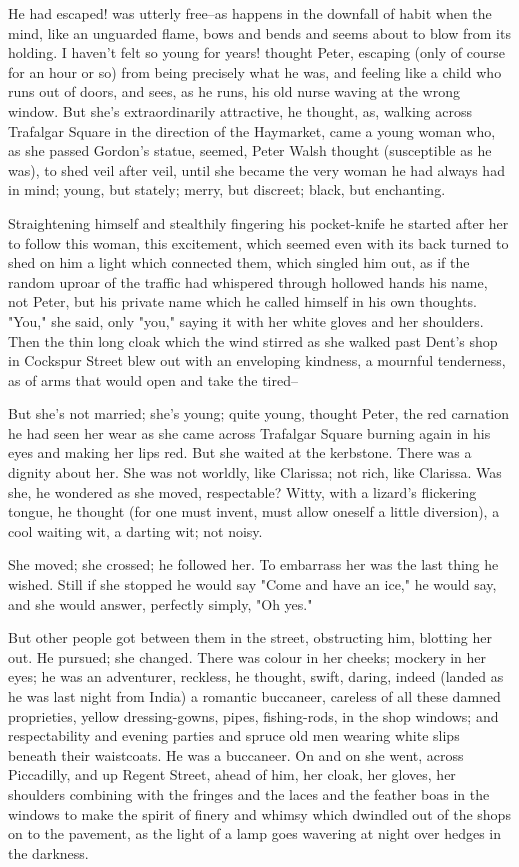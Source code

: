 \documentclass[lang=cn,10pt]{elegantbook}
\begin{document}
He had escaped! was utterly free--as happens in the downfall of
habit when the mind, like an unguarded flame, bows and bends and
seems about to blow from its holding.  I haven't felt so young for
years! thought Peter, escaping (only of course for an hour or so)
from being precisely what he was, and feeling like a child who runs
out of doors, and sees, as he runs, his old nurse waving at the
wrong window.  But she's extraordinarily attractive, he thought,
as, walking across Trafalgar Square in the direction of the
Haymarket, came a young woman who, as she passed Gordon's statue,
seemed, Peter Walsh thought (susceptible as he was), to shed veil
after veil, until she became the very woman he had always had in
mind; young, but stately; merry, but discreet; black, but
enchanting.

Straightening himself and stealthily fingering his pocket-knife he
started after her to follow this woman, this excitement, which
seemed even with its back turned to shed on him a light which
connected them, which singled him out, as if the random uproar of
the traffic had whispered through hollowed hands his name, not
Peter, but his private name which he called himself in his own
thoughts.  "You," she said, only "you," saying it with her white
gloves and her shoulders.  Then the thin long cloak which the wind
stirred as she walked past Dent's shop in Cockspur Street blew out
with an enveloping kindness, a mournful tenderness, as of arms that
would open and take the tired--

But she's not married; she's young; quite young, thought Peter, the
red carnation he had seen her wear as she came across Trafalgar
Square burning again in his eyes and making her lips red.  But she
waited at the kerbstone.  There was a dignity about her.  She was
not worldly, like Clarissa; not rich, like Clarissa.  Was she, he
wondered as she moved, respectable?  Witty, with a lizard's
flickering tongue, he thought (for one must invent, must allow
oneself a little diversion), a cool waiting wit, a darting wit; not
noisy.

She moved; she crossed; he followed her.  To embarrass her was the
last thing he wished.  Still if she stopped he would say "Come and
have an ice," he would say, and she would answer, perfectly simply,
"Oh yes."

But other people got between them in the street, obstructing him,
blotting her out.  He pursued; she changed.  There was colour in
her cheeks; mockery in her eyes; he was an adventurer, reckless, he
thought, swift, daring, indeed (landed as he was last night from
India) a romantic buccaneer, careless of all these damned
proprieties, yellow dressing-gowns, pipes, fishing-rods, in the
shop windows; and respectability and evening parties and spruce old
men wearing white slips beneath their waistcoats.  He was a
buccaneer.  On and on she went, across Piccadilly, and up Regent
Street, ahead of him, her cloak, her gloves, her shoulders
combining with the fringes and the laces and the feather boas in
the windows to make the spirit of finery and whimsy which dwindled
out of the shops on to the pavement, as the light of a lamp goes
wavering at night over hedges in the darkness.
\end{document}
